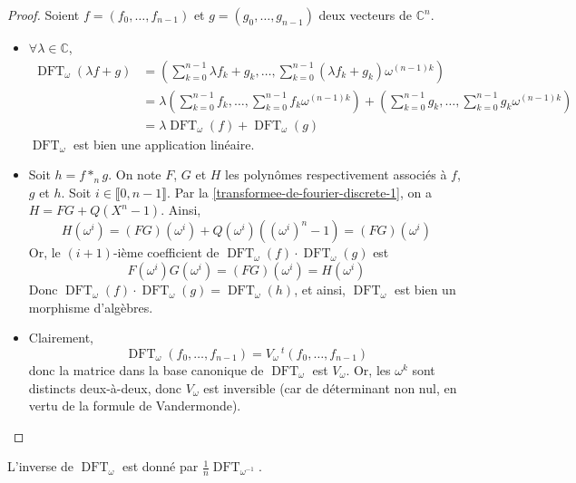 	\begin{proof}
		Soient $f = (f_0, \dots, f_{n-1})$ et $g = (g_0, \dots, g_{n-1})$ deux vecteurs de $\mathbb{C}^n$.
		\begin{itemize}
			\item $\forall \lambda \in \mathbb{C}$,
			\begin{align*}
				\operatorname{DFT}_\omega(\lambda f + g) &= \left(\sum_{k=0}^{n-1} \lambda f_k + g_k, \dots, \sum_{k=0}^{n-1} (\lambda f_k + g_k) \omega^{(n-1)k} \right) \\
				&= \lambda \left(\sum_{k=0}^{n-1} f_k, \dots, \sum_{k=0}^{n-1} f_k \omega^{(n-1)k} \right) + \left(\sum_{k=0}^{n-1} g_k, \dots, \sum_{k=0}^{n-1} g_k \omega^{(n-1)k} \right) \\
				&= \lambda \operatorname{DFT}_\omega(f) + \operatorname{DFT}_\omega(g)
			\end{align*}
			$\operatorname{DFT}_\omega$ est bien une application linéaire.
			\item Soit $h = f *_n g$. On note $F$, $G$ et $H$ les polynômes respectivement associés à $f$, $g$ et $h$.
			\newpar
			Soit $i \in \llbracket 0, n-1 \rrbracket$. Par la \cref{transformee-de-fourier-discrete-1}, on a $H = FG + Q(X^n - 1)$. Ainsi,
			\[ H(\omega^i) = (FG)(\omega^i) + Q(\omega^i)((\omega^i)^n - 1) = (FG)(\omega^i) \]
			Or, le $(i + 1)$-ième coefficient de $\operatorname{DFT}_\omega(f) \cdot \operatorname{DFT}_\omega(g)$ est
			\[ F(\omega^i) G(\omega^i) = (FG)(\omega^i) = H(\omega^i) \]
			Donc $\operatorname{DFT}_\omega(f) \cdot \operatorname{DFT}_\omega(g) = \operatorname{DFT}_\omega(h)$, et ainsi, $\operatorname{DFT}_\omega$ est bien un morphisme d'algèbres.
			\item Clairement,
			\[ \operatorname{DFT}_\omega(f_0, \dots, f_{n-1}) = V_\omega \, ^t (f_0, \dots, f_{n-1}) \]
			donc la matrice dans la base canonique de $\operatorname{DFT}_\omega$ est $V_\omega$. Or, les $\omega^k$ sont distincts deux-à-deux, donc $V_\omega$ est inversible (car de déterminant non nul, en vertu de la formule de Vandermonde).
		\end{itemize}
	\end{proof}
	
	\begin{proposition}
		\label{transformee-de-fourier-discrete-3}
		L'inverse de $\operatorname{DFT}_\omega$ est donné par $\frac{1}{n} \operatorname{DFT}_{\omega^{-1}}$.
	\end{proposition}
	
